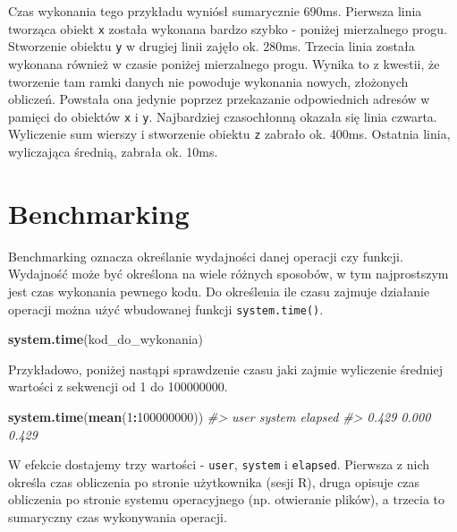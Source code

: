 \documentclass[paper=6in:9in,pagesize=pdftex,headinclude=on,footinclude=on,10pt]{scrbook}
\newenvironment{Shaded}{\begin{snugshade}}{\end{snugshade}}
\newcommand{\CommentTok}[1]{\textcolor[rgb]{0.56,0.35,0.01}{\textit{#1}}}
\newcommand{\DecValTok}[1]{\textcolor[rgb]{0.00,0.00,0.81}{#1}}
\newcommand{\KeywordTok}[1]{\textcolor[rgb]{0.13,0.29,0.53}{\textbf{#1}}}
\newcommand{\NormalTok}[1]{#1}
\newcommand{\OperatorTok}[1]{\textcolor[rgb]{0.81,0.36,0.00}{\textbf{#1}}}
\begin{document}
Czas wykonania tego przykładu wyniósł sumarycznie 690ms.
Pierwsza linia tworząca obiekt \texttt{x} została wykonana bardzo szybko - poniżej mierzalnego progu.
Stworzenie obiektu \texttt{y} w drugiej linii zajęło ok. 280ms.
Trzecia linia została wykonana również w czasie poniżej mierzalnego progu.
Wynika to z kwestii, że tworzenie tam ramki danych nie powoduje wykonania nowych, złożonych obliczeń.
Powstała ona jedynie poprzez przekazanie odpowiednich adresów w pamięci do obiektów \texttt{x} i \texttt{y}.
Najbardziej czasochłonną okazała się linia czwarta.
Wyliczenie sum wierszy i stworzenie obiektu \texttt{z} zabrało ok. 400ms.
Ostatnia linia, wyliczająca średnią, zabrała ok. 10ms.

\hypertarget{benchmarking}{%
\section{Benchmarking}\label{benchmarking}}

Benchmarking oznacza określanie wydajności danej operacji czy funkcji.
Wydajność może być określona na wiele różnych sposobów, w tym najprostszym jest czas wykonania pewnego kodu.
Do określenia ile czasu zajmuje działanie operacji można użyć wbudowanej funkcji \texttt{system.time()}.

\begin{Shaded}
\begin{Highlighting}[]
\KeywordTok{system.time}\NormalTok{(kod_do_wykonania)}
\end{Highlighting}
\end{Shaded}

Przykładowo, poniżej nastąpi sprawdzenie czasu jaki zajmie wyliczenie średniej wartości z sekwencji od 1 do 100000000.

\begin{Shaded}
\begin{Highlighting}[]
\KeywordTok{system.time}\NormalTok{(}\KeywordTok{mean}\NormalTok{(}\DecValTok{1}\OperatorTok{:}\DecValTok{100000000}\NormalTok{))}
\CommentTok{#>    user  system elapsed }
\CommentTok{#>   0.429   0.000   0.429}
\end{Highlighting}
\end{Shaded}

W efekcie dostajemy trzy wartości - \texttt{user}, \texttt{system} i \texttt{elapsed}. Pierwsza z nich określa czas obliczenia po stronie użytkownika (sesji R), druga opisuje czas obliczenia po stronie systemu operacyjnego (np. otwieranie plików), a trzecia to sumaryczny czas wykonywania operacji.
\end{document}
